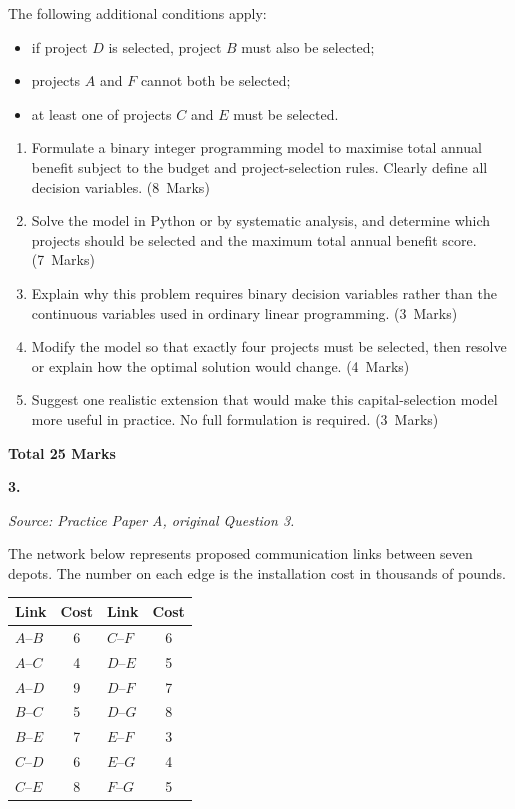 \documentclass[11pt,a4paper]{article}
\newcommand{\markalloc}[1]{\nobreak\hfill\mbox{(#1 Marks)}}
\newcommand{\questiontotal}[1]{\begin{flushright}\textbf{Total #1 Marks}\end{flushright}}
\begin{document}
The following additional conditions apply:
\begin{itemize}[leftmargin=0.9cm, itemsep=0.25em]
\item if project $D$ is selected, project $B$ must also be selected;
\item projects $A$ and $F$ cannot both be selected;
\item at least one of projects $C$ and $E$ must be selected.
\end{itemize}

\begin{enumerate}
\item Formulate a binary integer programming model to maximise total annual benefit subject to the budget and project-selection rules. Clearly define all decision variables. \markalloc{8}

\item Solve the model in Python or by systematic analysis, and determine which projects should be selected and the maximum total annual benefit score. \markalloc{7}

\item Explain why this problem requires binary decision variables rather than the continuous variables used in ordinary linear programming. \markalloc{3}

\item Modify the model so that exactly four projects must be selected, then resolve or explain how the optimal solution would change. \markalloc{4}

\item Suggest one realistic extension that would make this capital-selection model more useful in practice. No full formulation is required. \markalloc{3}
\end{enumerate}

\questiontotal{25}

\newpage

\textbf{3.}

\textit{Source: Practice Paper A, original Question 3.}



The network below represents proposed communication links between seven depots.
The number on each edge is the installation cost in thousands of pounds.

\begin{center}
\begin{tabular}{lclc}
\toprule
Link & Cost & Link & Cost \\
\midrule
$A$--$B$ & 6 & $C$--$F$ & 6 \\
$A$--$C$ & 4 & $D$--$E$ & 5 \\
$A$--$D$ & 9 & $D$--$F$ & 7 \\
$B$--$C$ & 5 & $D$--$G$ & 8 \\
$B$--$E$ & 7 & $E$--$F$ & 3 \\
$C$--$D$ & 6 & $E$--$G$ & 4 \\
$C$--$E$ & 8 & $F$--$G$ & 5 \\
\bottomrule
\end{tabular}
\end{center}
\end{document}
